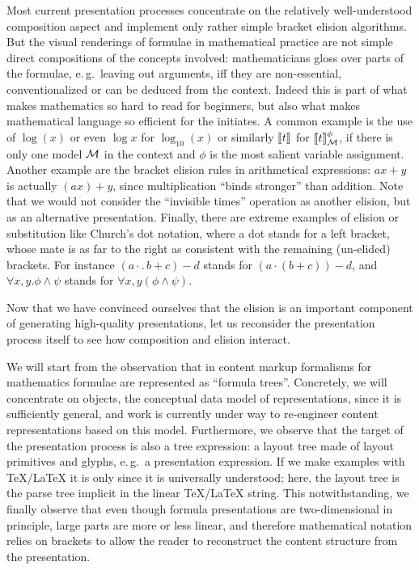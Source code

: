 Most current presentation processes concentrate on the relatively well-understood
composition aspect and implement only rather simple bracket elision algorithms. But the
visual renderings of formulae in mathematical practice are not simple direct compositions
of the concepts involved: mathematicians gloss over parts of the formulae, e.\,g.\ leaving
out arguments, iff they are non-essential, conventionalized or can be deduced from the
context. Indeed this is part of what makes mathematics so hard to read for beginners, but
also what makes mathematical language so efficient for the initiates. A common example is
the use of $\log(x)$ or even $\log x$ for $\log_{10}(x)$ or similarly $[\kern-.15em[ t]\kern-.15em]$ for
$[\kern-.15em[ t]\kern-.15em]_{\cal M}^\phi$, if there is only one model $\cal M$ in the context and
$\phi$ is the most salient variable assignment. Another example are the bracket elision
rules in arithmetical expressions: $ax+y$ is actually $(ax)+y$, since multiplication
``binds stronger'' than addition. Note that we would not consider the ``invisible times''
operation as another elision, but as an alternative presentation. Finally, there are
extreme examples of elision or substitution like Church's dot notation, where a dot stands
for a left bracket, whose mate is as far to the right as consistent with the remaining
(un-elided) brackets. For instance $(a\cdot.\,b+c)-d$ stands for $(a\cdot(b+c))-d$, and
$\forall x,y.\phi\wedge\psi$ stands for $\forall x,y (\phi\wedge\psi)$.

Now that we have convinced ourselves that the elision is an important component of
generating high-quality presentations, let us reconsider the presentation process itself
to see how composition and elision interact.

We will start from the observation that in content markup formalisms for mathematics
formulae are represented as ``formula trees''. Concretely, we will concentrate on
{\openmath} objects, the conceptual data model of {\openmath} representations, since it is
sufficiently general, and work is currently under way to re-engineer content {\mathml}
representations based on this model. Furthermore, we observe that the target of the
presentation process is also a tree expression: a layout tree made of layout primitives
and glyphs, e.\,g.\ a presentation {\mathml} expression. If we make examples with
{\TeX/\LaTeX} it is only since it is universally understood; here, the layout tree is the
parse tree implicit in the linear {\TeX/\LaTeX} string. This notwithstanding, we finally
observe that even though formula presentations are two-dimensional in principle, large
parts are more or less linear, and therefore mathematical notation relies on brackets to
allow the reader to reconstruct the content structure from the presentation.

